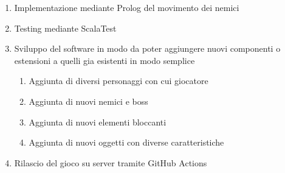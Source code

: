 \begin{enumerate}
\item Implementazione mediante Prolog del movimento dei nemici
\item Testing mediante ScalaTest
\item Sviluppo del software in modo da poter aggiungere nuovi componenti o estensioni a quelli gia esistenti in modo semplice
\begin{enumerate}
    \item Aggiunta di diversi personaggi con cui giocatore
    \item Aggiunta di nuovi nemici e boss
    \item Aggiunta di nuovi elementi bloccanti
    \item Aggiunta di nuovi oggetti con diverse caratteristiche
\end{enumerate}
\item Rilascio del gioco su server tramite GitHub Actions
\end{enumerate}